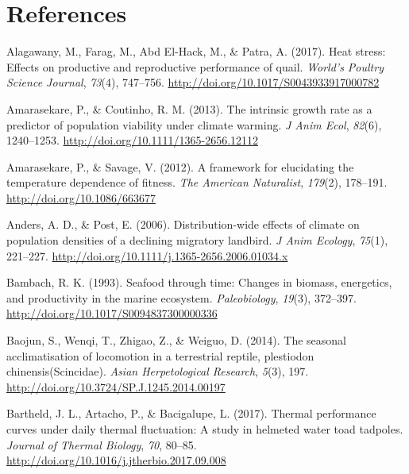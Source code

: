 \documentclass[12pt,twoside]{reedthesis}
\begin{document}
\hypertarget{references}{%
\chapter*{References}\label{references}}


\noindent

\setlength{\parindent}{-0.20in}
\setlength{\leftskip}{0.20in}
\setlength{\parskip}{8pt}

\hypertarget{refs}{}
\leavevmode\hypertarget{ref-alagawany_heat_2017}{}%
Alagawany, M., Farag, M., Abd El-Hack, M., \& Patra, A. (2017). Heat stress: Effects on productive and reproductive performance of quail. \emph{World's Poultry Science Journal}, \emph{73}(4), 747--756. \url{http://doi.org/10.1017/S0043933917000782}

\leavevmode\hypertarget{ref-amarasekare_intrinsic_2013}{}%
Amarasekare, P., \& Coutinho, R. M. (2013). The intrinsic growth rate as a predictor of population viability under climate warming. \emph{J Anim Ecol}, \emph{82}(6), 1240--1253. \url{http://doi.org/10.1111/1365-2656.12112}

\leavevmode\hypertarget{ref-amarasekare_framework_2012}{}%
Amarasekare, P., \& Savage, V. (2012). A framework for elucidating the temperature dependence of fitness. \emph{The American Naturalist}, \emph{179}(2), 178--191. \url{http://doi.org/10.1086/663677}

\leavevmode\hypertarget{ref-anders_distribution-wide_2006}{}%
Anders, A. D., \& Post, E. (2006). Distribution-wide effects of climate on population densities of a declining migratory landbird. \emph{J Anim Ecology}, \emph{75}(1), 221--227. \url{http://doi.org/10.1111/j.1365-2656.2006.01034.x}

\leavevmode\hypertarget{ref-bambach_seafood_1993}{}%
Bambach, R. K. (1993). Seafood through time: Changes in biomass, energetics, and productivity in the marine ecosystem. \emph{Paleobiology}, \emph{19}(3), 372--397. \url{http://doi.org/10.1017/S0094837300000336}

\leavevmode\hypertarget{ref-baojun_seasonal_2014}{}%
Baojun, S., Wenqi, T., Zhigao, Z., \& Weiguo, D. (2014). The seasonal acclimatisation of locomotion in a terrestrial reptile, plestiodon chinensis(Scincidae). \emph{Asian Herpetological Research}, \emph{5}(3), 197. \url{http://doi.org/10.3724/SP.J.1245.2014.00197}

\leavevmode\hypertarget{ref-bartheld_thermal_2017-2}{}%
Bartheld, J. L., Artacho, P., \& Bacigalupe, L. (2017). Thermal performance curves under daily thermal fluctuation: A study in helmeted water toad tadpoles. \emph{Journal of Thermal Biology}, \emph{70}, 80--85. \url{http://doi.org/10.1016/j.jtherbio.2017.09.008}
\end{document}
